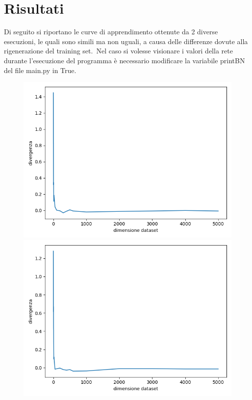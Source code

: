 \documentclass[14pt]{extarticle}
\begin{document}
	\section{Risultati}
	Di seguito si riportano le curve di apprendimento ottenute da 2 diverse esecuzioni, le quali sono simili ma non uguali, a causa delle differenze dovute alla rigenerazione del training set.\
	Nel caso si volesse visionare  i valori della rete durante l'esecuzione del programma è necessario modificare la variabile printBN del file main.py in True.
	\begin{figure}[t]
	\includegraphics[scale=0.8]{Figure_1.png}\\
	\includegraphics[scale=0.8]{Figure_2.png}\\
	\centering
	\end{figure}
	
\end{document}
